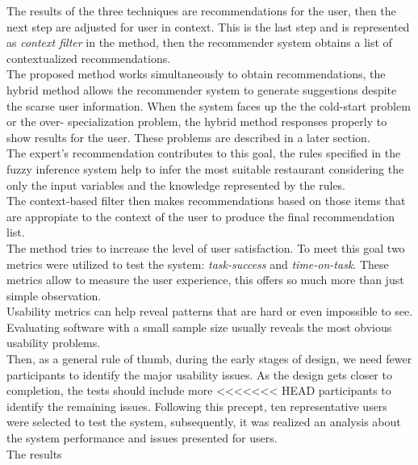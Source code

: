 The results of the three techniques are recommendations for the user,
then the next step are adjusted  for user in context. This is the last
step and is represented as \textit{context filter} in the method, then
the recommender system obtains a list of contextualized
recommendations. \\The proposed method works simultaneously to
obtain recommendations, the hybrid method allows the recommender
system to generate suggestions despite the scarse user information.
When the system faces up the the cold-start problem or the over-
specialization problem, the hybrid method responses properly to show
results for the user. These problems are described in a later
section. \\
The expert's recommendation contributes to this goal, the rules
specified in the fuzzy inference system help to infer the most
suitable restaurant considering the only the input variables and the
knowledge represented by the rules.\\ The context-based filter then
makes recommendations based on those items that are appropiate to the
context of the user to produce the final recommendation list. \\
The method tries to increase the  level of user satisfaction.
To meet this goal two metrics were utilized to test the system:
\textit{task-success} and \textit{time-on-task}. These metrics allow
to measure the user experience, this offers so much more than just
simple observation. \\Usability metrics can help reveal patterns that
are hard or even impossible to see. Evaluating software with a small
sample size usually reveals the most obvious usability
problems\cite{albert2013measuring}.\\
Then, as a general rule of thumb, during the early stages of design,
we need fewer participants to identify the major usability issues. As
the design gets closer to completion, the tests should include more
<<<<<<< HEAD
participants to identify the remaining issues. Following this precept,
ten representative users were selected to test the system,
subsequently, it was realized an analysis about the system performance
and issues presented for users.\\
The results

